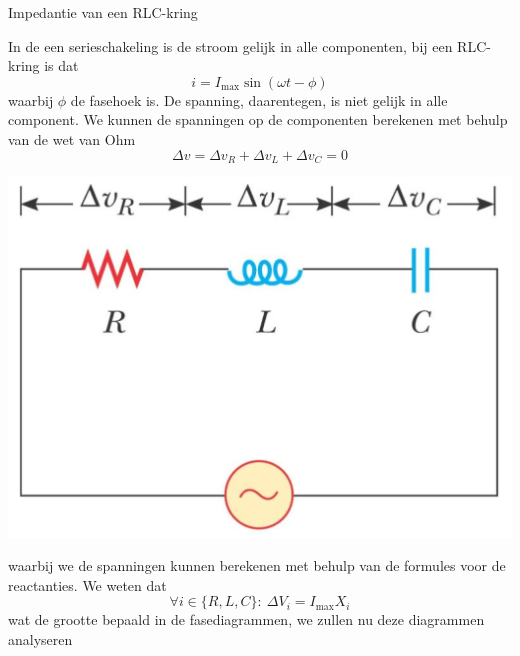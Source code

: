 \newpage

\begin{theo}{Impedantie van een RLC-kring}
    \begin{minipage}{.68\textwidth}
        In de een serieschakeling is de stroom gelijk in alle componenten, bij een RLC-kring is dat
        \begin{equation*}
            i = I_{\max}\sin(\omega t - \phi)
        \end{equation*}
        waarbij $\phi$ de fasehoek is. De spanning, daarentegen, is niet gelijk in alle component. We kunnen de spanningen op de componenten berekenen met behulp van de wet van Ohm
        \begin{equation*}
            \Delta v = \Delta v_{R} + \Delta v_{L} + \Delta v_{C} = 0
        \end{equation*}
    \end{minipage}
    \hspace{0.1cm}\vspace{-0.1cm}
    \begin{minipage}{.28\textwidth}
        \includegraphics[scale = 0.2]{Images/Magnetisme/RLCWisselstroomkring}
    \end{minipage}

    \vspace{0.3cm}
    \noindent waarbij we de spanningen kunnen berekenen met behulp van de formules voor de reactanties. We weten dat
    \begin{equation*}
        \forall i \in \{R,L,C\}: \ \Delta V_i = I_{\text{max}}X_i
    \end{equation*}
    wat de grootte bepaald in de fasediagrammen, we zullen nu deze diagrammen analyseren


\end{theo}
